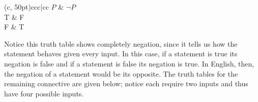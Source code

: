 \documentclass[twoside]{report}
\begin{document}
\vspace{\baselineskip}
\begin{center}
	\begin{TAB}(c, 50pt){cc}{c|cc}
		$P$ & $\neg P$ \\
		T & F \\
		F & T \\
	\end{TAB}
\end{center}
\vspace{\baselineskip}

Notice this truth table shows completely negation, since it tells us how the statement behaves given every input. In this case, if a statement is true its negation is false and if a statement is false its negation is true. In English, then, the negation of a statement would be its opposite. The truth tables for the remaining connective are given below; notice each require two inputs and thus have four possible inputs.
\end{document}

